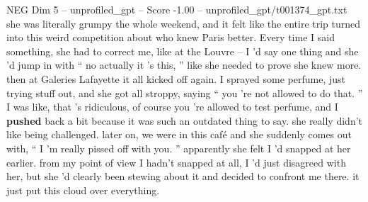\begin{textsample}{NEG Dim 5 – unprofiled\_gpt – Score -1.00 – unprofiled\_gpt/t001374\_gpt.txt}  \label{ex:f5_neg_010}
she was literally grumpy the whole weekend, and it felt like the entire trip turned into this weird competition about who knew Paris better.
Every time I said something, she had to correct me, like at the Louvre – I ’d say one thing and she ’d jump in with “ no actually it ’s this, ” like she needed to prove she knew more. then at Galeries Lafayette it all kicked off again.
I sprayed some perfume, just trying stuff out, and she got all stroppy, saying “ you ’re not allowed to do that. ” I was like, that ’s ridiculous, of course you ’re allowed to test perfume, and I \textbf{pushed} back a bit because it was such an outdated thing to say. she really didn't like being challenged. later on, we were in this café and she suddenly comes out with, “ I ’m really pissed off with you. ” apparently she felt I ’d snapped at her earlier. from my point of view I hadn't snapped at all, I ’d just disagreed with her, but she ’d clearly been stewing about it and decided to confront me there. it just put this cloud over everything.

\end{textsample}
